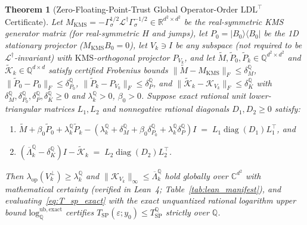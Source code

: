 \documentclass[11pt,a4paper]{article}
\newtheorem{theorem}{Theorem}[section]
\theoremstyle{definition}
\newcommand{\R}{\mathbb{R}}
\newcommand{\Q}{\mathbb{Q}}
\newcommand{\C}{\mathbb{C}}
\newcommand{\KMS}{\mathrm{KMS}}
\newcommand{\Kchr}{\mathcal{K}}
\begin{document}
\begin{theorem}[Zero-Floating-Point-Trust Global Operator-Order $\mathrm{LDL}^\top$ Certificate]
\label{thm:ldlt_cert}
Let $M_{\KMS} = -\Gamma_\sigma^{1/2}\mathcal{L}^\dagger\Gamma_\sigma^{-1/2} \in \R^{d^2 \times d^2}$ be the real-symmetric KMS generator matrix (for real-symmetric $H$ and jumps), let $P_0 = |B_0\rangle\langle B_0|$ be the 1D stationary projector ($M_{\KMS} B_0 = 0$), let $V_k \ni I$ be \emph{any} subspace (not required to be $\mathcal{L}^\dagger$-invariant) with $\KMS$-orthogonal projector $P_{V_k}$, and let $\tilde{M}, \tilde{P}_0, \tilde{P}_k \in \Q^{d^2 \times d^2}$ and $\tilde{\Kchr}_k \in \Q^{d \times d}$ satisfy certified Frobenius bounds $\|\tilde{M} - M_{\KMS}\|_F \le \delta_M^{\Q}$, $\|\tilde{P}_0 - P_0\|_F \le \delta_{P_0}^{\Q}$, $\|\tilde{P}_k - P_{V_k}\|_F \le \delta_P^{\Q}$, and $\|\tilde{\Kchr}_k - \Kchr_{V_k}\|_F \le \delta_K^{\Q}$ with $\delta_M^{\Q}, \delta_{P_0}^{\Q}, \delta_P^{\Q}, \delta_K^{\Q} \ge 0$ and $\lambda_k^{\Q} > 0$, $\beta_0 > 0$. Suppose exact rational unit lower-triangular matrices $L_1, L_2$ and nonnegative rational diagonals $D_1, D_2 \ge 0$ satisfy:
\begin{enumerate}[label=(\roman*),leftmargin=2em,itemsep=2pt]
  \item $\tilde{M} + \beta_0 \tilde{P}_0 + \lambda_k^{\Q} \tilde{P}_k - (\lambda_k^{\Q} + \delta_M^{\Q} + \beta_0 \delta_{P_0}^{\Q} + \lambda_k^{\Q} \delta_P^{\Q}) I \;=\; L_1 \operatorname{diag}(D_1) L_1^\top$, and
  \item $(\overline{\Lambda}_k^{\Q} - \delta_K^{\Q}) I - \tilde{\Kchr}_k \;=\; L_2 \operatorname{diag}(D_2) L_2^\top$.
\end{enumerate}
Then $\lambda_{\mathrm{op}}(V_k^\perp) \ge \lambda_k^{\Q}$ and $\|\Kchr_{V_k}\|_\infty \le \overline{\Lambda}_k^{\Q}$ hold globally over $\C^{d^2}$ with mathematical certainty (verified in Lean~4; Table~\ref{tab:lean_manifest}), and evaluating~\eqref{eq:T_sp_exact} with the exact unquantized rational logarithm upper bound $\mathrm{log}_{\Q}^{\mathrm{ub,exact}}$ certifies $T_{\mathrm{SP}}(\varepsilon; y_0) \le T_{\mathrm{SP}}^{\Q}$ strictly over $\Q$.
\end{theorem}
\end{document}
